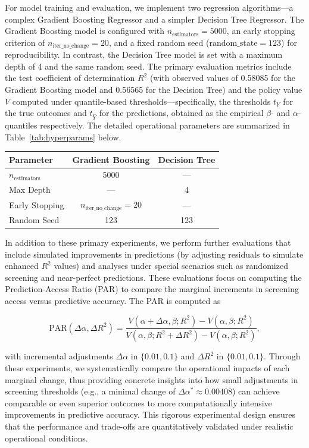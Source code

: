 \documentclass[11pt]{article}
\begin{document}
For model training and evaluation, we implement two regression algorithms—a complex Gradient Boosting Regressor and a simpler Decision Tree Regressor. The Gradient Boosting model is configured with \(n_{\text{estimators}}=5000\), an early stopping criterion of \(n_{\text{iter\_no\_change}}=20\), and a fixed random seed (\(\text{random\_state}=123\)) for reproducibility. In contrast, the Decision Tree model is set with a maximum depth of 4 and the same random seed. The primary evaluation metrics include the test coefficient of determination \(R^2\) (with observed values of 0.58085 for the Gradient Boosting model and 0.56565 for the Decision Tree) and the policy value \(V\) computed under quantile-based thresholds—specifically, the thresholds \(t_{Y}\) for the true outcomes and \(t_{\hat{Y}}\) for the predictions, obtained as the empirical \(\beta\)- and \(\alpha\)-quantiles respectively. The detailed operational parameters are summarized in Table~\ref{tab:hyperparams} below.

\begin{center}
\begin{tabular}{|l|c|c|}
\hline
\textbf{Parameter} & \textbf{Gradient Boosting} & \textbf{Decision Tree} \\
\hline
\(n_{\text{estimators}}\) & 5000 & --- \\
Max Depth & --- & 4 \\
Early Stopping & \(n_{\text{iter\_no\_change}}=20\) & --- \\
Random Seed & 123 & 123 \\
\hline
\end{tabular}
\end{center}

In addition to these primary experiments, we perform further evaluations that include simulated improvements in predictions (by adjusting residuals to simulate enhanced \(R^2\) values) and analyses under special scenarios such as randomized screening and near-perfect predictions. These evaluations focus on computing the Prediction-Access Ratio (PAR) to compare the marginal increments in screening access versus predictive accuracy. The PAR is computed as

\[
\text{PAR}(\Delta \alpha, \Delta R^2)=\frac{V(\alpha+\Delta \alpha,\beta; R^2)-V(\alpha,\beta; R^2)}{V(\alpha,\beta; R^2+\Delta R^2)-V(\alpha,\beta; R^2)},
\]

with incremental adjustments \(\Delta \alpha\) in \(\{0.01, 0.1\}\) and \(\Delta R^2\) in \(\{0.01, 0.1\}\). Through these experiments, we systematically compare the operational impacts of each marginal change, thus providing concrete insights into how small adjustments in screening thresholds (e.g., a minimal change of \(\Delta \alpha^*\approx0.00408\)) can achieve comparable or even superior outcomes to more computationally intensive improvements in predictive accuracy. This rigorous experimental design ensures that the performance and trade-offs are quantitatively validated under realistic operational conditions.
\end{document}
